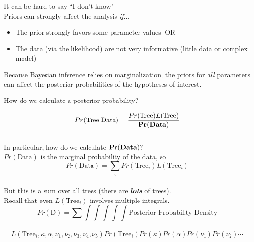 \documentclass{seminar}
\begin{document}
\begin{slide}
It can be hard to say ``I don't know"\\[20pt]

	\large Priors can strongly affect the analysis {\em if}...
\begin{itemize}
	\item The prior strongly favors some parameter values, OR
	\item The data (via the likelihood) are not very informative (little data or complex model)\\[20pt]
\end{itemize}

 Because Bayesian inference relies on marginalization, the priors for {\em all} parameters can affect the posterior probabilities of the hypotheses of interest.


\newslide
\Large How do we calculate a posterior probability?\large \\[10pt]

\begin{center}
\[Pr(\mbox{Tree}|\mbox{Data}) = \frac{Pr(\mbox{Tree})L(\mbox{Tree})}{\bf Pr(\mbox{\bf Data})}\]\\[15pt]

\Large In particular, how do we calculate ${\bf Pr(\mbox{\bf Data})}$?\large \\[10pt]
\newslide
\Large $Pr(\mbox{Data})$ is the marginal probability of the data, so\large
\[ Pr(\mbox{Data})  = \sum_i Pr(\mbox{Tree}_i)L(\mbox{Tree}_i)\]\\[10pt]
But this is a sum over all trees (there are {\bf \em lots} of trees).\\[20pt]
Recall that even $L(\mbox{Tree}_i)$ involves multiple integrals.
\newslide
\large
\[ Pr(\mbox{D})  =\sum\int\int\int\int\int \mbox{Posterior Probability Density} \]\\[30pt]
\[L(\mbox{Tree}_i, \kappa, \alpha, \nu_1, \nu_2,\nu_3,\nu_4, \nu_5) Pr(\mbox{Tree}_i) Pr(\kappa) Pr(\alpha) Pr(\nu_1) Pr(\nu_2) \cdots\]\\[30pt]


\end{center}
\end{slide}
\end{document}
